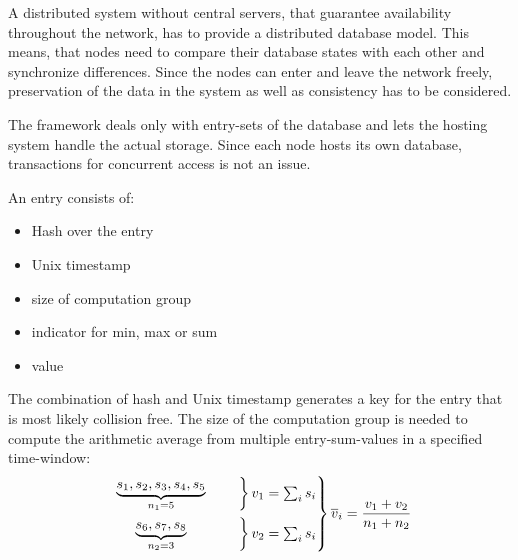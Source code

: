 A distributed system without central servers, that guarantee availability throughout the network, has to provide a distributed database model. This means, that nodes need to compare their database states with each other and synchronize differences. Since the nodes can enter and leave the network freely, preservation of the data in the system as well as consistency has to be considered.

The framework deals only with entry-sets of the database and lets the hosting system handle the actual storage. Since each node hosts its own database, transactions for concurrent access is not an issue.

\noindent An entry consists of:
\begin{itemize}
	\item Hash over the entry
	\item Unix timestamp
	\item size of computation group
	\item indicator for min, max or sum
	\item value
\end{itemize}

The combination of hash and Unix timestamp generates a key for the entry that is most likely collision free. The size of the computation group is needed to compute the arithmetic average from multiple entry-sum-values in a specified time-window: 
\begin{align*}
\begin{rcases*}
\begin{rcases*}
\mathmakebox[2.5cm][c]{ \underbrace{s_1, s_2, s_3, s_4, s_5}_{n_1=5} }  & \quad
\end{rcases*} v_1=\sum_{i}s_i \\
\begin{rcases*}
\mathmakebox[2.5cm][c]{ \underbrace{s_6, s_7, s_8}_{n_2=3} } & \quad
\end{rcases*} v_2=\sum_{i}s_i
\end{rcases*} \overline{v}_i=\frac{v_1+v_2}{n_1+n_2}
\end{align*}

